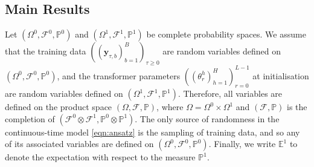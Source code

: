 \documentclass{article}
\newcommand{\E}{\mathbb{E}}
\begin{document}
\subsection{Main Results}\label{sec:MainTheorem}
Let $(\Omega^0,\mathcal F^0,\mathbb P^0)$ and $(\Omega^1,\mathcal F^1,\mathbb P^1)$ be complete probability spaces. We assume that the training data $((\bm{y}_{\tau,b})_{b=1}^B)_{\tau\ge 0}$ are random variables defined on $(\Omega^0,\mathcal F^0,\mathbb P^0)$, and the transformer parameters $((\theta^h_r)_{h=1}^H)_{r=0}^{L-1}$ at initialisation are random variables defined on $(\Omega^1,\mathcal F^1,\mathbb P^1)$. Therefore, all variables are defined on the product space $(\Omega,\mathcal F,\mathbb P)$, where $\Omega=\Omega^0\times \Omega^1$ and $(\mathcal F,\mathbb P)$ is the completion of $(\mathcal F^0\otimes\mathcal F^1,\mathbb P^0\otimes \mathbb P^1)$. The only source of randomness in the continuous-time model \eqref{eqn:ansatz} is the sampling of training data, and so any of its associated variables are defined on $(\Omega^0,\mathcal F^0,\mathbb P^0)$. Finally, we write $\E^1$ to denote the expectation with respect to the measure $\mathbb  P^1$. 
\end{document}
